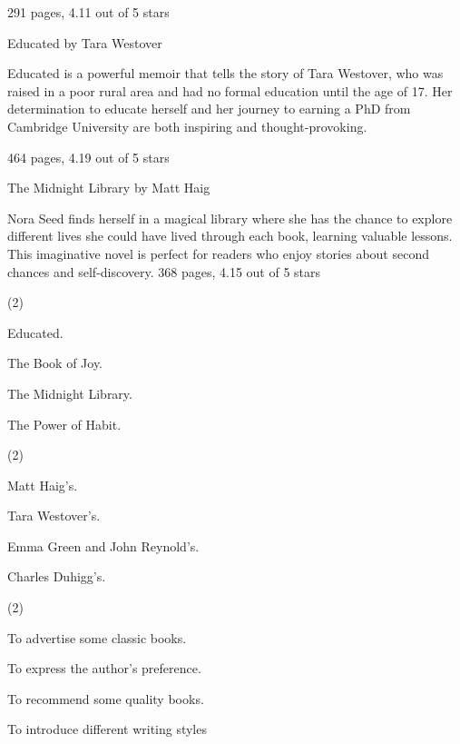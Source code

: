 \documentclass{英语试卷}
\begin{document}
\par 291 pages, 4.11 out of 5 stars\par
\par Educated by Tara Westover\par
\par Educated is a powerful memoir that tells the story of Tara Westover, who was raised in a poor rural area and had no formal education until the age of 17. Her determination to educate herself and her journey to earning a PhD from Cambridge University are both inspiring and thought-provoking.\par
\par 464 pages, 4.19 out of 5 stars\par
\par The Midnight Library by Matt Haig\par
\par Nora Seed finds herself in a magical library where she has the chance to explore different lives she could have lived through each book, learning valuable lessons. This imaginative novel is perfect for readers who enjoy stories about second chances and self-discovery. 368 pages, 4.15 out of 5 stars\par
{}
\begin{choices}(2)
  \item Educated.
  \item The Book of Joy.
  \item The Midnight Library.
  \item The Power of Habit.
\end{choices}
\begin{choices}(2)
  \item Matt Haig's.
  \item Tara Westover's.
  \item Emma Green and John Reynold's.
  \item Charles Duhigg's.
\end{choices}
\begin{choices}(2)
  \item To advertise some classic books.
  \item To express the author's preference.
  \item To recommend some quality books.
  \item To introduce different writing styles
\end{choices}
\end{document}
